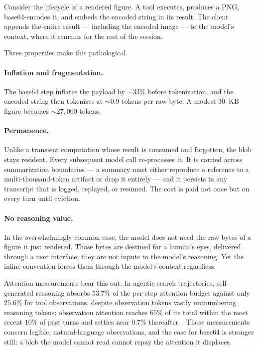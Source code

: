 \documentclass[11pt]{article}
\begin{document}
Consider the lifecycle of a rendered figure. A tool executes, produces a PNG, base64-encodes it, and embeds the encoded string in its result. The client appends the entire result --- including the encoded image --- to the model's context, where it remains for the rest of the session.

Three properties make this pathological.

\paragraph{Inflation and fragmentation.} The base64 step inflates the payload by ${\sim}33\%$ before tokenization, and the encoded string then tokenizes at ${\sim}0.9$ tokens per raw byte. A modest 30~KB figure becomes ${\sim}27{,}000$ tokens.

\paragraph{Permanence.} Unlike a transient computation whose result is consumed and forgotten, the blob stays resident. Every subsequent model call re-processes it. It is carried across summarization boundaries --- a summary must either reproduce a reference to a multi-thousand-token artifact or drop it entirely --- and it persists in any transcript that is logged, replayed, or resumed. The cost is paid not once but on every turn until eviction.

\paragraph{No reasoning value.} In the overwhelmingly common case, the model does not need the raw bytes of a figure it just rendered. Those bytes are destined for a human's eyes, delivered through a user interface; they are not inputs to the model's reasoning. Yet the inline convention forces them through the model's context regardless.

Attention measurements bear this out. In agentic-search trajectories, self-generated reasoning absorbs $53.7\%$ of the per-step attention budget against only $25.6\%$ for tool observations, despite observation tokens vastly outnumbering reasoning tokens; observation attention reaches $65\%$ of its total within the most recent $10\%$ of past turns and settles near $0.7\%$ thereafter~\citep{regimemap}. Those measurements concern legible, natural-language observations, and the case for base64 is stronger still: a blob the model cannot read cannot repay the attention it displaces.
\end{document}
